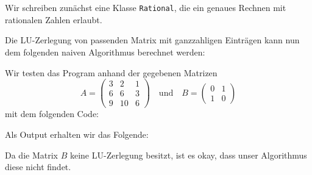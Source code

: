\section{}
\label{section: LU decomposition}

Wir schreiben zunächst eine Klasse \texttt{Rational}, die ein genaues Rechnen mit rationalen Zahlen erlaubt.



Die LU-Zerlegung von passenden Matrix mit ganzzahligen Einträgen kann nun dem folgenden naiven Algorithmus berechnet werden:



Wir testen das Program anhand der gegebenen Matrizen
\[
    A
    = \begin{pmatrix}
        3 &  2 & 1  \\
        6 &  6 & 3  \\
        9 & 10 & 6
      \end{pmatrix}
    \quad\text{und}\quad
    B
    = \begin{pmatrix}
        0 & 1 \\
        1 & 0
      \end{pmatrix}
\]
mit dem folgenden Code:



Als Output erhalten wir das Folgende:


Da die Matrix $B$ keine LU-Zerlegung besitzt, ist es okay, dass unser Algorithmus diese nicht findet.
